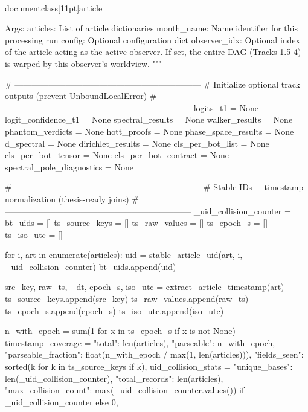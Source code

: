 \\documentclass[11pt]{article}
\begin{document}
\begin{CodeBlock}
        Args:
            articles: List of article dictionaries
            month_name: Name identifier for this processing run
            config: Optional configuration dict
            observer_idx: Optional index of the article acting as the active observer.
                         If set, the entire DAG (Tracks 1.5-4) is warped by this observer's worldview.
        """

        # ------------------------------------------------------------------
        # Initialize optional track outputs (prevent UnboundLocalError)
        # ------------------------------------------------------------------
        logits_t1 = None
        logit_confidence_t1 = None
        spectral_results = None
        walker_results = None
        phantom_verdicts = None
        hott_proofs = None
        phase_space_results = None
        d_spectral = None
        dirichlet_results = None
        cls_per_bot_list = None
        cls_per_bot_tensor = None
        cls_per_bot_contract = None
        spectral_pole_diagnostics = None

        # ------------------------------------------------------------------
        # Stable IDs + timestamp normalization (thesis-ready joins)
        # ------------------------------------------------------------------
        _uid_collision_counter = {}
        bt_uids = []
        ts_source_keys = []
        ts_raw_values = []
        ts_epoch_s = []
        ts_iso_utc = []

        for i, art in enumerate(articles):
            uid = stable_article_uid(art, i, _uid_collision_counter)
            bt_uids.append(uid)

            src_key, raw_ts, _dt, epoch_s, iso_utc = extract_article_timestamp(art)
            ts_source_keys.append(src_key)
            ts_raw_values.append(raw_ts)
            ts_epoch_s.append(epoch_s)
            ts_iso_utc.append(iso_utc)

        n_with_epoch = sum(1 for x in ts_epoch_s if x is not None)
        timestamp_coverage = {
            "total": len(articles),
            "parseable": n_with_epoch,
            "parseable_fraction": float(n_with_epoch / max(1, len(articles))),
            "fields_seen": sorted({k for k in ts_source_keys if k}),
        }
        uid_collision_stats = {
            "unique_bases": len(_uid_collision_counter),
            "total_records": len(articles),
            "max_collision_count": max(_uid_collision_counter.values()) if _uid_collision_counter else 0,
        }


\end{CodeBlock}
\end{document}
